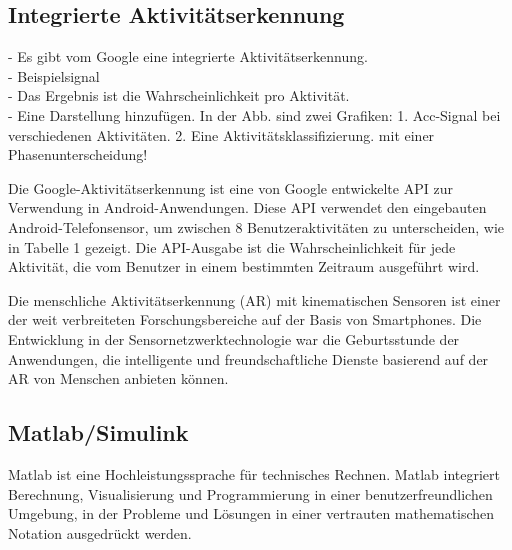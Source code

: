 %
%
%
%

\subsection{Integrierte Aktivitätserkennung}

- Es gibt vom Google eine integrierte Aktivitätserkennung.\\

- Beispielsignal\\

- Das Ergebnis ist die Wahrscheinlichkeit pro Aktivität.\\

- Eine Darstellung hinzufügen. In der Abb. sind zwei Grafiken: 1. Acc-Signal bei verschiedenen Aktivitäten. 2. Eine Aktivitätsklassifizierung. mit einer Phasenunterscheidung!


Die Google-Aktivitätserkennung ist eine von Google entwickelte API zur Verwendung in Android-Anwendungen. Diese API verwendet den eingebauten Android-Telefonsensor, um zwischen 8 Benutzeraktivitäten zu unterscheiden, wie in Tabelle 1 gezeigt. Die API-Ausgabe ist die Wahrscheinlichkeit für jede Aktivität, die vom Benutzer in einem bestimmten Zeitraum ausgeführt wird. \citep{Elbayoumy2018}


Die menschliche Aktivitätserkennung (AR) mit kinematischen Sensoren ist einer der weit verbreiteten Forschungsbereiche auf der Basis von Smartphones. Die Entwicklung in der Sensornetzwerktechnologie war die Geburtsstunde der Anwendungen, die intelligente und freundschaftliche Dienste basierend auf der AR von Menschen anbieten können.

\subsection{Matlab/Simulink}

Matlab ist eine Hochleistungssprache für technisches Rechnen. Matlab integriert Berechnung, Visualisierung und Programmierung in einer benutzerfreundlichen Umgebung, in der Probleme und Lösungen in einer vertrauten mathematischen Notation ausgedrückt werden.

